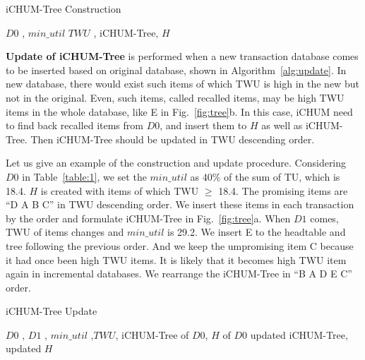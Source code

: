 \documentclass[runningheads,a4paper]{llncs}
\begin{document}
\begin{algorithm}
\caption{iCHUM-Tree Construction}
\begin{algorithmic}
\REQUIRE  $ D0 $ ,  $ min\_util $
\ENSURE  $ TWU $ , iCHUM-Tree, $ H $
\STATE{}
\ENDFOR
\end{algorithmic}
\label{alg:construct}
\end{algorithm}

\textbf{Update of iCHUM-Tree} is performed when a new transaction database comes to be inserted based on original database, shown in Algorithm~\ref{alg:update}. In new database, there would exist such items of which TWU is high in the new but not in the original. Even, such items, called recalled items, may be high TWU items in the whole database, like E in Fig.~\ref{fig:tree}b. In this case, iCHUM need to find back recalled items from $ D0 $, and insert them to $ H $ as well as iCHUM-Tree. Then iCHUM-Tree should be updated in TWU descending order.

Let us give an example of the construction and update procedure. Considering $ D0 $ in Table~\ref{table:1}, we set the $ min\_util $ as 40\% of the sum of TU, which is 18.4. $ H $ is created with items of which TWU $ \ge $ 18.4. The promising items are ``D A B C'' in TWU descending order. We insert these items in each transaction by the order and formulate iCHUM-Tree in Fig.~\ref{fig:tree}a. When $ D1 $ comes, TWU of items changes and $ min\_util $ is 29.2. We insert E to the headtable and tree following the previous order. And we keep the umpromising item C because it had once been high TWU items. It is likely that it becomes high TWU item again in incremental databases. We rearrange the iCHUM-Tree in ``B A D E C'' order. 

\begin{algorithm}
\caption{iCHUM-Tree Update}
\label{alg:update}
\begin{algorithmic}
\REQUIRE $ D0 $ , $ D1 $ ,  $ min\_util $ ,$ TWU $, iCHUM-Tree of $ D0 $, $ H $ of $ D0 $
\ENSURE  updated iCHUM-Tree, updated $ H $

\end{algorithmic}
\end{algorithm}
\end{document}
